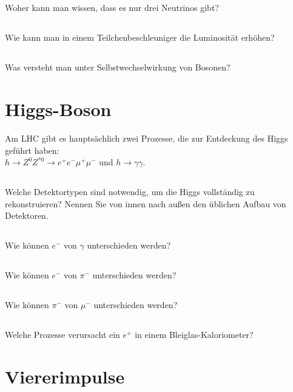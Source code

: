 \subsection{} Woher kann man wissen, dass es nur drei Neutrinos gibt?
\subsection{} Wie kann man in einem Teilchenbeschleuniger die Luminosität erhöhen?
\subsection{} Was versteht man unter Selbstwechselwirkung von Bosonen?

\section{Higgs-Boson} Am LHC gibt es hauptsächlich zwei Prozesse, die zur Entdeckung des Higgs geführt haben:\\
$ h \rightarrow Z^0 Z^{*0} \rightarrow e^+ e^- \mu^+ \mu^- $ und $ h \rightarrow \gamma \gamma $.
\subsection{} Welche Detektortypen sind notwendig, um die Higgs vollständig zu rekonstruieren? Nennen Sie von innen nach außen den üblichen Aufbau von Detektoren.
\subsection{} Wie können $e^-$ von $\gamma$ unterschieden werden?
\subsection{} Wie können $e^-$ von $\pi^-$ unterschieden werden?
\subsection{} Wie können $\pi^-$ von $\mu^-$ unterschieden werden?
\subsection{} Welche Prozesse verursacht ein $e^+$ in einem Bleiglas-Kaloriometer?

\section{Viererimpulse}
